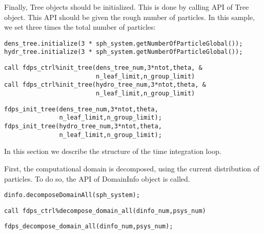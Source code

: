 Finally, \textsf{Tree} objects should be initialized. This is done by calling API  of \textsf{Tree} object. This API should be given the rough number of particles. In this sample, we set three times the total number of particles:
\ifCpp %
\begin{lstlisting}[caption=Initialization of tree objects]
dens_tree.initialize(3 * sph_system.getNumberOfParticleGlobal());
hydr_tree.initialize(3 * sph_system.getNumberOfParticleGlobal());
\end{lstlisting}
\endifCpp
\ifFtn %
\begin{lstlisting}[caption=Initialization of tree objects]
call fdps_ctrl%init_tree(dens_tree_num,3*ntot,theta, &
                         n_leaf_limit,n_group_limit)
call fdps_ctrl%init_tree(hydro_tree_num,3*ntot,theta, &
                         n_leaf_limit,n_group_limit)
\end{lstlisting}
\endifFtn
\ifC %
\begin{lstlisting}[caption=Initialization of tree objects]
fdps_init_tree(dens_tree_num,3*ntot,theta,
               n_leaf_limit,n_group_limit);
fdps_init_tree(hydro_tree_num,3*ntot,theta,
               n_leaf_limit,n_group_limit);
\end{lstlisting}
\endifC

In this section we describe the structure of the time integration loop.

First, the computational domain is decomposed, using the current distribution of particles. To do so, the API  of \textsf{DomainInfo} object is called.

\ifCpp %
\begin{lstlisting}[caption=Domain Decomposition]
dinfo.decomposeDomainAll(sph_system);
\end{lstlisting}
\endifCpp
\ifFtn %
\begin{lstlisting}[caption=Domain Decomposition]
call fdps_ctrl%decompose_domain_all(dinfo_num,psys_num)
\end{lstlisting}
\endifFtn
\ifC %
\begin{lstlisting}[caption=Domain Decomposition]
fdps_decompose_domain_all(dinfo_num,psys_num);
\end{lstlisting}
\endifC


